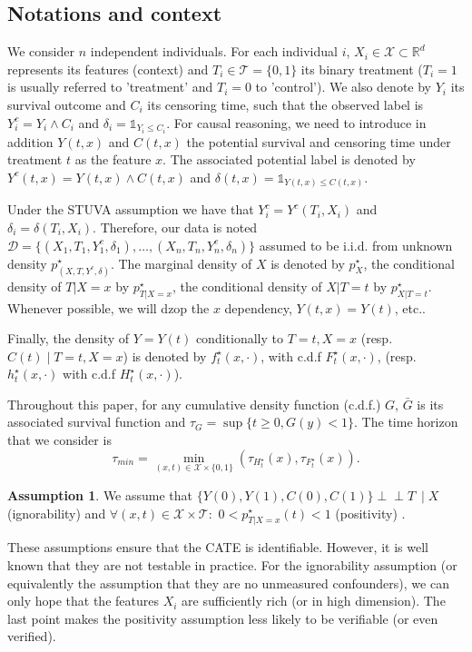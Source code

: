 \documentclass[12pt]{article}
\theoremstyle{plain}
\theoremstyle{definition}
\newtheorem{assumption}[theorem]{Assumption}
\theoremstyle{remark}
\newcommand\independent{\perp \!\!\! \perp }
\begin{document}
\subsection{Notations and context }
We consider $n$ independent individuals. For each individual $i$, $X_i \in \mathcal X \subset \mathbb R^d$ represents its features (context) and  $T_i \in \mathcal T = \{0,1\}$ its binary treatment ($T_i=1$ is usually referred to 'treatment' and $T_i=0$ to 'control'). We also denote by $Y_i$ its survival outcome and $C_i$ its censoring time, such that the observed label is $Y_i^c=Y_i \wedge  C_i$ and $\delta_i =\mathds{1}_{Y_i \leq C_i} $.
For causal reasoning, we need to introduce in addition $Y(t,x)$ and $C(t,x)$ the potential survival and censoring time under treatment $t$ as the feature $x$. The associated potential label is denoted by $Y^c(t,x)=Y(t,x)\wedge C(t,x)$ and $\delta(t,x)=\mathds{1}_{Y(t,x)\leq C(t,x)} $.

Under the STUVA assumption \cite{Rubin2005CausalDecisions} we have that $Y_i^c= Y^c(T_i,X_i)$ and $\delta_i= \delta(T_i,X_i)$. Therefore, our data is noted $\mathcal{D}=\{(X_1,T_1,Y_1^c,\delta_1), \ldots, (X_n,T_n,Y_n^c,\delta_n)\}$ assumed to be i.i.d. from unknown density $p^\star_{(X,T,Y^c,\delta)}$. The marginal density of $X$ is denoted by $p^\star_{X}$, the conditional density of $T | X= x$ by $p^\star_{T | X=x}$, the conditional density of $X | T=t$ by $p^\star_{X | T=t}$. Whenever possible, we will dzop the $x$ dependency, $Y(t,x)=Y(t)$, etc..


Finally, the density of $Y=Y(t)$ conditionally to $T=t,X=x$  (resp. $C(t) \mid T=t, X=x$) is denoted by $f^{\star}_{t}( x,\cdot )$, with c.d.f $F^{\star}_{t}( x,\cdot )$, (resp. $h^{\star}_{t}( x,\cdot )$ with c.d.f $H^{\star}_{t}( x,\cdot )$). 

Throughout this paper, for any cumulative density function (c.d.f.) $G$, $\bar G$ is its associated survival function and $\tau_G = \sup\{t \geq 0, G(y)<1\}.$ The time horizon that we consider is
\begin{equation*}
 \tau_{min}=\min_{(x,t)\in \mathcal{X}\times\{0,1\} }(\tau_{H^\star_t}(x),\tau_{F^\star_t}(x)).   
\end{equation*}


\begin{assumption}\label{ass:ignor_pos}
We assume that $\{Y(0) ,Y(1),C(0),C(1)\} \independent T\ \mid X$ (ignorability) and $\forall (x , t) \in  \mathcal{X} \times \mathcal{T}:$ $0< p^\star_{T | X=x}(t) < 1$ (positivity) \cite{ImbensRecentDI,Pearl2000CausalityMR}. 
\end{assumption}
These assumptions ensure that the CATE is identifiable. However, it is well known that they are not testable in practice. For the ignorability assumption (or equivalently the assumption that they are no unmeasured confounders), we can only hope that the features $X_i$ are sufficiently rich (or in high dimension). The last point makes the positivity assumption less likely to be verifiable (or even verified).
\end{document}
